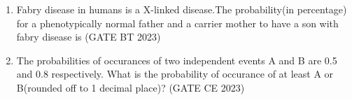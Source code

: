\begin{enumerate}[label=\thechapter.\arabic*,ref=\thechapter.\theenumi]
\item Fabry disease in humans is a X-linked disease.The probability(in percentage) for a phenotypically normal father and a carrier mother to have a son with fabry disease is
\hfill (GATE BT 2023) \\

\item The probabilities of occurances of two independent events A and B are 0.5 and 0.8 respectively. What is the probability of occurance of at least A or B(rounded off to 1 decimal place)?
\hfill (GATE CE 2023)\\

\end{enumerate}
